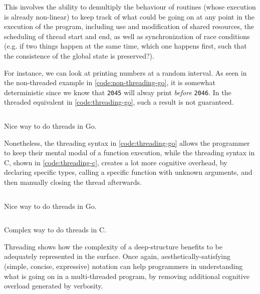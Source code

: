 This involves the ability to demultiply the behaviour of routines (whose execution is already non-linear) to keep track of what could be going on at any point in the execution of the program, including use and modification of shared resources, the scheduling of thread start and end, as well as synchronization of race conditions (e.g. if two things happen at the same time, which one happens first, such that the consistence of the global state is preserved?).

For instance, we can look at printing numbers at a random interval. As seen in the non-threaded example in \ref{code:non-threading-go}, it is somewhat deterministic since we know that \lstinline{2045} will alway print \emph{before} \lstinline{2046}. In the threaded equivalent in \ref{code:threading-go}, such a result is not guaranteed.

\begin{listing}
  \inputminted{python}{./corpus/non-thread.go}
  \caption{Nice way to do threads in Go.}
  \label{code:non-threading-go}
\end{listing}

Nonetheless, the threading syntax in \ref{code:threading-go} allows the programmer to keep their mental modal of a function execution, while the threading syntax in C, shown in \ref{code:threading-c}, creates a lot more cognitive overhead, by declaring specific types, calling a specific function with unknown arguments, and then manually closing the thread afterwards.

\begin{listing}
  \inputminted{python}{./corpus/thread.go}
  \caption{Nice way to do threads in Go.}
  \label{code:threading-go}
\end{listing}

\begin{listing}
  \inputminted{python}{./corpus/thread.c}
  \caption{Complex way to do threads in C.}
  \label{code:threading-c}
\end{listing}

Threading shows how the complexity of a deep-structure benefits to be adequately represented in the surface. Once again, aesthetically-satisfying (simple, concise, expressive) notation can help programmers in understanding what is going on in a multi-threaded program, by removing additional cognitive overload generated by verbosity.

